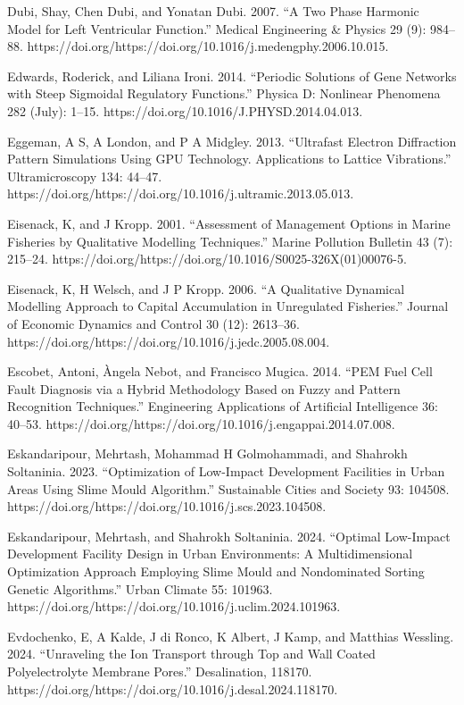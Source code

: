 \documentclass[utf8]{gradu3}
\begin{document}
Dubi, Shay, Chen Dubi, and Yonatan Dubi. 2007. “A Two Phase Harmonic Model for Left Ventricular Function.” Medical Engineering \& Physics 29 (9): 984–88. https://doi.org/https://doi.org/10.1016/j.medengphy.2006.10.015.

Edwards, Roderick, and Liliana Ironi. 2014. “Periodic Solutions of Gene Networks with Steep Sigmoidal Regulatory Functions.” Physica D: Nonlinear Phenomena 282 (July): 1–15. https://doi.org/10.1016/J.PHYSD.2014.04.013.

Eggeman, A S, A London, and P A Midgley. 2013. “Ultrafast Electron Diffraction Pattern Simulations Using GPU Technology. Applications to Lattice Vibrations.” Ultramicroscopy 134: 44–47. https://doi.org/https://doi.org/10.1016/j.ultramic.2013.05.013.

Eisenack, K, and J Kropp. 2001. “Assessment of Management Options in Marine Fisheries by Qualitative Modelling Techniques.” Marine Pollution Bulletin 43 (7): 215–24. https://doi.org/https://doi.org/10.1016/S0025-326X(01)00076-5.

Eisenack, K, H Welsch, and J P Kropp. 2006. “A Qualitative Dynamical Modelling Approach to Capital Accumulation in Unregulated Fisheries.” Journal of Economic Dynamics and Control 30 (12): 2613–36. https://doi.org/https://doi.org/10.1016/j.jedc.2005.08.004.

Escobet, Antoni, Àngela Nebot, and Francisco Mugica. 2014. “PEM Fuel Cell Fault Diagnosis via a Hybrid Methodology Based on Fuzzy and Pattern Recognition Techniques.” Engineering Applications of Artificial Intelligence 36: 40–53. https://doi.org/https://doi.org/10.1016/j.engappai.2014.07.008.

Eskandaripour, Mehrtash, Mohammad H Golmohammadi, and Shahrokh Soltaninia. 2023. “Optimization of Low-Impact Development Facilities in Urban Areas Using Slime Mould Algorithm.” Sustainable Cities and Society 93: 104508. https://doi.org/https://doi.org/10.1016/j.scs.2023.104508.

Eskandaripour, Mehrtash, and Shahrokh Soltaninia. 2024. “Optimal Low-Impact Development Facility Design in Urban Environments: A Multidimensional Optimization Approach Employing Slime Mould and Nondominated Sorting Genetic Algorithms.” Urban Climate 55: 101963. https://doi.org/https://doi.org/10.1016/j.uclim.2024.101963.

Evdochenko, E, A Kalde, J di Ronco, K Albert, J Kamp, and Matthias Wessling. 2024. “Unraveling the Ion Transport through Top and Wall Coated Polyelectrolyte Membrane Pores.” Desalination, 118170. https://doi.org/https://doi.org/10.1016/j.desal.2024.118170.
\end{document}
